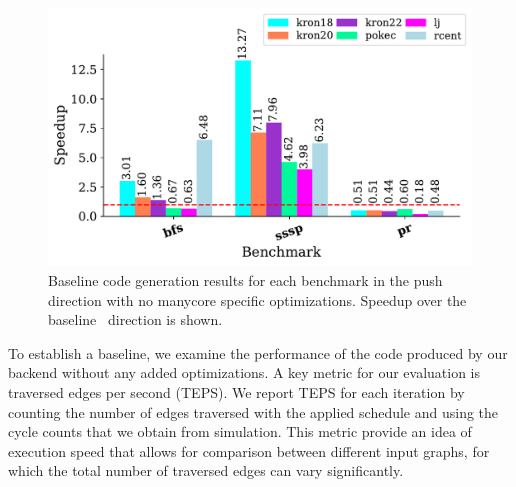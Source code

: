 \begin{figure}[!ht]
    \centering
    \includegraphics[scale = 0.65]{graphit-figures/push.pdf}
    \caption{Baseline code generation results for each benchmark in the push direction with no manycore specific optimizations. Speedup over the baseline \pull~direction is shown.}
    \label{pap:generals:sec:eval:fig:push}
\end{figure}
To establish a baseline, we examine the performance of the code produced by our backend without any added optimizations.
A key metric for our evaluation is traversed edges per second (TEPS).
We report TEPS for each iteration by counting the number of edges traversed with the applied \graphit schedule and using the cycle counts that we obtain from simulation.
This metric provide an idea of execution speed that allows for comparison between different input graphs, for which the total number of traversed edges can vary significantly.

